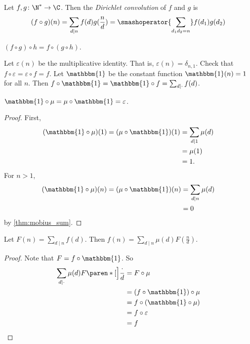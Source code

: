\begin{definition*} \label{def:dirichlet}
    Let $f, g\colon \N^* \to \C$.
    Then the \emph{Dirichlet convolution} of $f$ and $g$ is \[
        (f \circ g)(n) = \sum_{d \mid n} f(d) g(\frac{n}{d})
            = \smashoperator{\sum_{d_1 d_2 = n}} f(d_1) g(d_2)
    \]
\end{definition*}
\begin{exercise}
    $(f \circ g) \circ h = f \circ (g \circ h)$.
\end{exercise}
Let $\varepsilon(n)$ be the multiplicative identity.
That is, $\varepsilon(n) = \delta_{n,1}$.
Check that $f \circ \varepsilon = \varepsilon \circ f = f$.
Let $\mathbbm{1}$ be the constant function $\mathbbm{1}(n) = 1$ for all $n$.
Then $f \circ \mathbbm{1} = \mathbbm{1} \circ f = \sum_{d \mid \cdot} f(d)$.
\begin{lemma}
    $\mathbbm{1} \circ \mu = \mu \circ \mathbbm{1} = \varepsilon$.
\end{lemma}
\begin{proof}
    First, \begin{align*}
        (\mathbbm{1} \circ \mu)(1) = (\mu \circ \mathbbm{1})(1)
        &= \sum_{d \mid 1} \mu(d) \\
        &= \mu(1) \\
        &= 1.
    \end{align*}
    For $n > 1$, \begin{align*}
        (\mathbbm{1} \circ \mu)(n) = (\mu \circ \mathbbm{1})(n)
        &= \sum_{d \mid n} \mu(d) \\
        &= 0
    \end{align*}
    by \cref{thm:mobius_sum}.
\end{proof}

\begin{theorem*} \label{thm:nt:mobius_inversion}
    Let $F(n) = \sum_{d \mid n} f(d)$.
    Then $f(n) = \sum_{d \mid n} \mu(d) F(\frac{n}{d})$.
\end{theorem*}
\begin{proof}
    Note that $F = f \circ \mathbbm{1}$.
    So \begin{align*}
        \sum_{d \mid \cdot} \mu(d) F\paren*[\Big]{\frac{\cdot}{d}}
            &= F \circ \mu \\
            &= (f \circ \mathbbm{1}) \circ \mu \\
            &= f \circ (\mathbbm{1} \circ \mu) \\
            &= f \circ \varepsilon \\
            &= f \qedhere
    \end{align*}
\end{proof}
